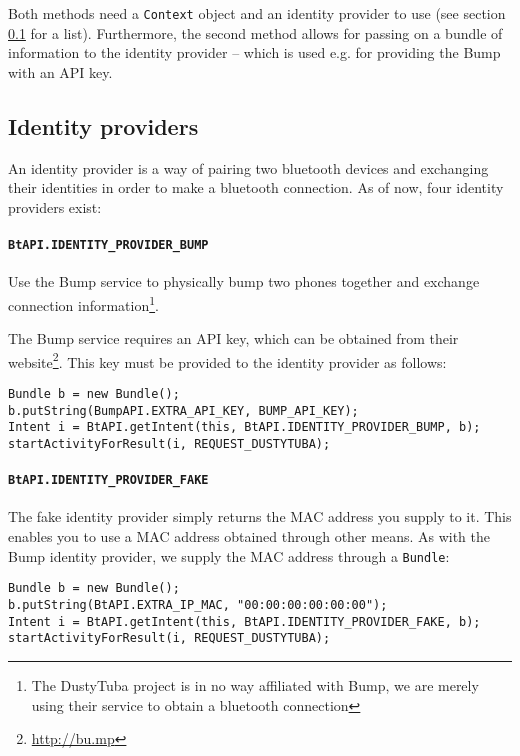 \documentclass[a4paper,11pt]{article}
\begin{document}
Both methods need a \verb+Context+ object and an identity provider to use (see section \ref{identity-providers} for a list). Furthermore, the second method allows for passing on a bundle of information to the identity provider -- which is used e.g. for providing the Bump\texttrademark{} with an API key.

\subsection{Identity providers}
\label{identity-providers}
An identity provider is a way of pairing two bluetooth devices and exchanging their identities in order to make a bluetooth connection. As of now, four identity providers exist:

\paragraph{{\tt BtAPI.IDENTITY\_PROVIDER\_BUMP}}
Use the Bump\texttrademark{} service to physically bump two phones together and exchange connection information\footnote{The DustyTuba project is in no way affiliated with Bump\texttrademark, we are merely using their service to obtain a bluetooth connection}.

The Bump\texttrademark{} service requires an API key, which can be obtained from their website\footnote{\url{http://bu.mp}}. This key must be provided to the identity provider as follows:

\footnotesize
\begin{verbatim}
Bundle b = new Bundle();
b.putString(BumpAPI.EXTRA_API_KEY, BUMP_API_KEY);
Intent i = BtAPI.getIntent(this, BtAPI.IDENTITY_PROVIDER_BUMP, b);
startActivityForResult(i, REQUEST_DUSTYTUBA);
\end{verbatim}
\normalsize

\paragraph{{\tt BtAPI.IDENTITY\_PROVIDER\_FAKE}}
The fake identity provider simply returns the MAC address you supply to it. This enables you to use a MAC address obtained through other means. As with the Bump\texttrademark{} identity provider, we supply the MAC address through a \verb+Bundle+:

\footnotesize
\begin{verbatim}
Bundle b = new Bundle();
b.putString(BtAPI.EXTRA_IP_MAC, "00:00:00:00:00:00");
Intent i = BtAPI.getIntent(this, BtAPI.IDENTITY_PROVIDER_FAKE, b);
startActivityForResult(i, REQUEST_DUSTYTUBA);
\end{verbatim}
\normalsize
\end{document}
